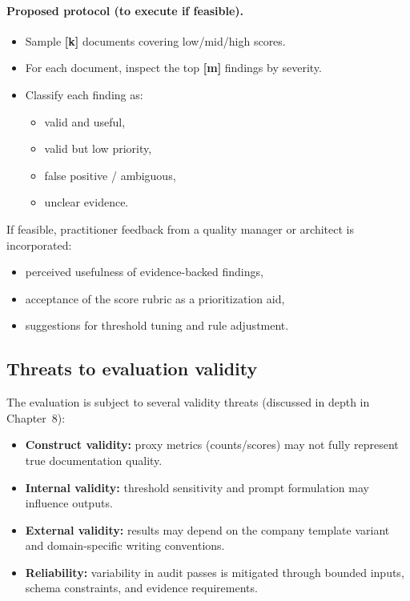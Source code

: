 \paragraph{Proposed protocol (to execute if feasible).}
\begin{itemize}
    \item Sample \textbf{[k]} documents covering low/mid/high scores.
    \item For each document, inspect the top \textbf{[m]} findings by severity.
    \item Classify each finding as:
    \begin{itemize}
        \item valid and useful,
        \item valid but low priority,
        \item false positive / ambiguous,
        \item unclear evidence.
    \end{itemize}
\end{itemize}

If feasible, practitioner feedback from a quality manager or architect is incorporated:
\begin{itemize}
    \item perceived usefulness of evidence-backed findings,
    \item acceptance of the score rubric as a prioritization aid,
    \item suggestions for threshold tuning and rule adjustment.
\end{itemize}

\subsection{Threats to evaluation validity}
\label{sec:eval_threats}

The evaluation is subject to several validity threats (discussed in depth in Chapter~8):
\begin{itemize}
    \item \textbf{Construct validity:} proxy metrics (counts/scores) may not fully represent true documentation quality.
    \item \textbf{Internal validity:} threshold sensitivity and prompt formulation may influence outputs.
    \item \textbf{External validity:} results may depend on the company template variant and domain-specific writing conventions.
    \item \textbf{Reliability:} variability in audit passes is mitigated through bounded inputs, schema constraints, and evidence requirements.
\end{itemize}

